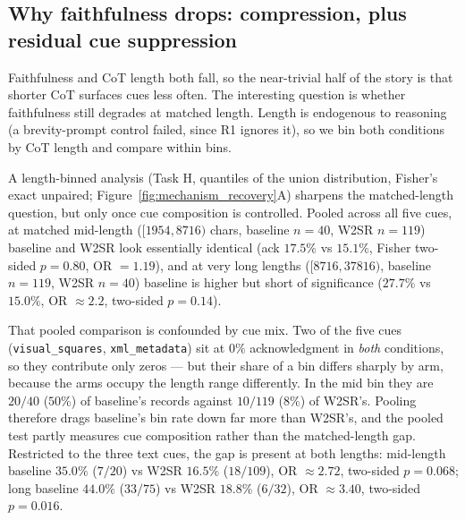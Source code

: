 \documentclass{article}
\begin{document}
\subsection{Why faithfulness drops: compression, plus residual cue suppression}
\label{sec:mech}
Faithfulness and CoT length both fall, so the near-trivial half of the story
is that shorter CoT surfaces cues less often. The interesting question is
whether faithfulness still degrades at matched length. Length is endogenous to
reasoning (a brevity-prompt control failed, since R1 ignores it), so we bin
both conditions by CoT length and compare within bins.

A length-binned analysis (Task H, quantiles of the union distribution,
Fisher's exact unpaired; Figure~\ref{fig:mechanism_recovery}A) sharpens the
matched-length question, but only once cue composition is controlled. Pooled
across all five cues, at matched mid-length ($[1954, 8716)$ chars, baseline
$n = 40$, W2SR $n = 119$) baseline and W2SR look essentially identical (ack
$17.5\%$ vs $15.1\%$, Fisher two-sided $p = 0.80$, OR $= 1.19$), and at very
long lengths ($[8716, 37816)$, baseline $n = 119$, W2SR $n = 40$) baseline is
higher but short of significance ($27.7\%$ vs $15.0\%$, OR $\approx 2.2$,
two-sided $p = 0.14$).

That pooled comparison is confounded by cue mix. Two of the five cues
(\texttt{visual\_squares}, \texttt{xml\_metadata}) sit at $0\%$ acknowledgment
in \emph{both} conditions, so they contribute only zeros --- but their share of
a bin differs sharply by arm, because the arms occupy the length range
differently. In the mid bin they are $20/40$ ($50\%$) of baseline's records
against $10/119$ ($8\%$) of W2SR's. Pooling therefore drags baseline's bin rate
down far more than W2SR's, and the pooled test partly measures cue composition
rather than the matched-length gap. Restricted to the three text cues, the gap
is present at both lengths: mid-length baseline $35.0\%$ ($7/20$) vs W2SR
$16.5\%$ ($18/109$), OR $\approx 2.72$, two-sided $p = 0.068$; long baseline
$44.0\%$ ($33/75$) vs W2SR $18.8\%$ ($6/32$), OR $\approx 3.40$, two-sided
$p = 0.016$.
\end{document}

